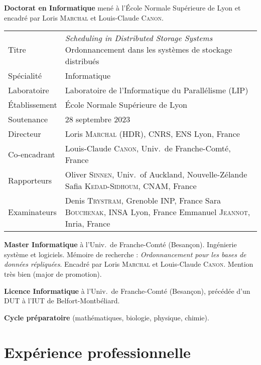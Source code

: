 \documentclass[12pt]{article}
\newcommand{\cvitem}[2]{\item[#1] #2}
\newcounter{cvitems}
\begin{document}
\begin{cvitems}
    \cvitem{2020--2023}{\textbf{Doctorat en Informatique} mené à l'École Normale Supérieure de Lyon
    et encadré par Loris \textsc{Marchal} et Louis-Claude \textsc{Canon}.

    \renewcommand{\arraystretch}{1.4}
    \begin{tabularx}{\linewidth}{@{}lX@{}}
        Titre         & \emph{\foreignlanguage{english}{Scheduling in Distributed Storage Systems}} \newline
                        Ordonnancement dans les systèmes de stockage distribués \tabularnewline
        Spécialité    & Informatique \tabularnewline
        Laboratoire   & Laboratoire de l'Informatique du Parallélisme (LIP) \tabularnewline
        Établissement & École Normale Supérieure de Lyon \tabularnewline
        Soutenance    & 28 septembre 2023 \tabularnewline
        Directeur     & Loris \textsc{Marchal} (HDR), CNRS, ENS Lyon, France \tabularnewline
        Co-encadrant  & Louis-Claude \textsc{Canon}, Univ.\ de Franche-Comté, France \tabularnewline
        Rapporteurs   & Oliver \textsc{Sinnen}, Univ.\ of Auckland, Nouvelle-Zélande \newline
                        Safia \textsc{Kedad-Sidhoum}, CNAM, France \tabularnewline
        Examinateurs  & Denis \textsc{Trystram}, Grenoble INP, France \newline
                        Sara \textsc{Bouchenak}, INSA Lyon, France \newline
                        Emmanuel \textsc{Jeannot}, Inria, France \tabularnewline
    \end{tabularx}}

    \cvitem{2018--2020}{\textbf{Master Informatique} à l'Univ.\ de Franche-Comté (Besançon).  
    Ingénierie système et logiciels.  
    Mémoire de recherche : \emph{Ordonnancement pour les bases de données répliquées}.  
    Encadré par Loris \textsc{Marchal} et Louis-Claude \textsc{Canon}.  
    Mention très bien (major de promotion).}

    \cvitem{2015--2018}{\textbf{Licence Informatique} à l'Univ.\ de Franche-Comté (Besançon),
    précédée d'un DUT à l'IUT de Belfort-Montbéliard.}

    \cvitem{2013-2015}{\textbf{Cycle préparatoire} (mathématiques, biologie, physique, chimie).}
\end{cvitems}

\section{Expérience professionnelle}
\end{document}
